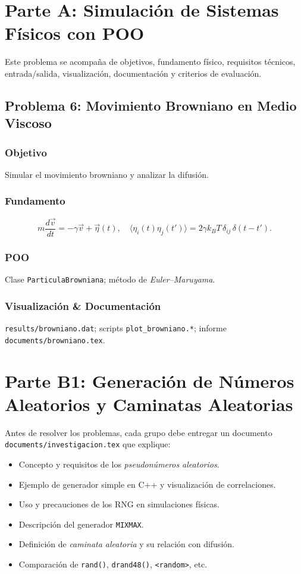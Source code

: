 \documentclass[11pt]{article}
\begin{document}
\section{Parte A: Simulación de Sistemas Físicos con POO}
Este problema se acompaña de objetivos, fundamento físico, requisitos técnicos, entrada/salida, visualización, documentación y criterios de evaluación.
\subsection{Problema 6: Movimiento Browniano en Medio Viscoso}

\subsubsection*{Objetivo}
Simular el movimiento browniano y analizar la difusión.

\subsubsection*{Fundamento}
\[
m\frac{d\vec v}{dt}= -\gamma\vec v + \vec\eta(t),\quad
\langle\eta_i(t)\eta_j(t')\rangle=2\gamma k_B T\,\delta_{ij}\,\delta(t-t').
\]

\subsubsection*{POO}
Clase \texttt{ParticulaBrowniana}; método de \emph{Euler–Maruyama}.

\subsubsection*{Visualización \& Documentación}
\texttt{results/browniano.dat}; scripts \texttt{plot\_browniano.*}; informe \texttt{documents/browniano.tex}.


\section{Parte B1: Generación de Números Aleatorios y Caminatas Aleatorias}

Antes de resolver los problemas, cada grupo debe entregar un documento \texttt{documents/investigacion.tex} que explique:
\begin{itemize}
  \item Concepto y requisitos de los \emph{pseudonúmeros aleatorios}.
  \item Ejemplo de generador simple en C++ y visualización de correlaciones.
  \item Uso y precauciones de los RNG en simulaciones físicas.
  \item Descripción del generador \texttt{MIXMAX}.
  \item Definición de \emph{caminata aleatoria} y su relación con difusión.
  \item Comparación de \texttt{rand()}, \texttt{drand48()}, \texttt{<random>}, etc.
\end{itemize}
\end{document}
